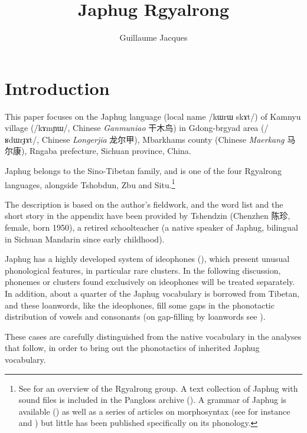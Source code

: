 \documentclass[oldfontcommands,oneside,a4paper,11pt]{article}
\newcommand{\ipa}[1]{/#1/} %
\newcommand{\zh}[1]{{\cn #1}}
\begin{document}
 

\title{Japhug Rgyalrong}
\author{Guillaume Jacques}
\maketitle
\linenumbers
 \section{Introduction}
 This paper focuses on the Japhug language (local name \ipa{kɯrɯ skɤt}) of Kamnyu village (\ipa{kɤmɲɯ}, Chinese \textit{Ganmuniao} \zh{干木鸟}) in Gdong-brgyad area (\ipa{ʁdɯrɟɤt}, Chinese  \textit{Longerjia} \zh{龙尔甲}), Mbarkhams county (Chinese \textit{Maerkang} \zh{马尔康}), Rngaba prefecture, Sichuan province, China.
 
 Japhug belongs to the Sino-Tibetan family, and is one of the four Rgyalrong languages, alongside Tshobdun, Zbu and Situ.\footnote{See  \citet{jackson00sidaba} for an overview of the Rgyalrong group. A text collection of Japhug with sound files is included in the Pangloss archive (\citealt{michailovsky14pangloss}). A grammar of Japhug is available (\citealt{jacques08}) as well as a series of articles on morphosyntax (see for instance  \citealt{jacques13harmonization} and
 \citealt{jacques14antipassive}) but little has been published specifically on its phonology. } 
 
The description is based on the author’s fieldwork, and the word list and the short story in the appendix have been provided by Tshendzin (Chenzhen \zh{陈珍}, female, born 1950), a retired schoolteacher (a native speaker of Japhug, bilingual in Sichuan Mandarin since early childhood).

 Japhug has a highly  developed system of ideophones (\citealt{japhug14ideophones}), which present unusual phonological features, in particular rare clusters. In the following discussion, phonemes or clusters found exclusively on  ideophones will be treated separately. In addition, about a quarter of the Japhug vocabulary is borrowed from Tibetan, and these loanwords, like the ideophones, fill some gaps in the phonotactic distribution of vowels and consonants (on gap-filling by loanwords see \citealt[63-64]{martinet05economie}).
 
 These cases are carefully distinguished from the native vocabulary in the analyses that follow, in order to bring out the phonotactics of inherited Japhug vocabulary.
\end{document}
